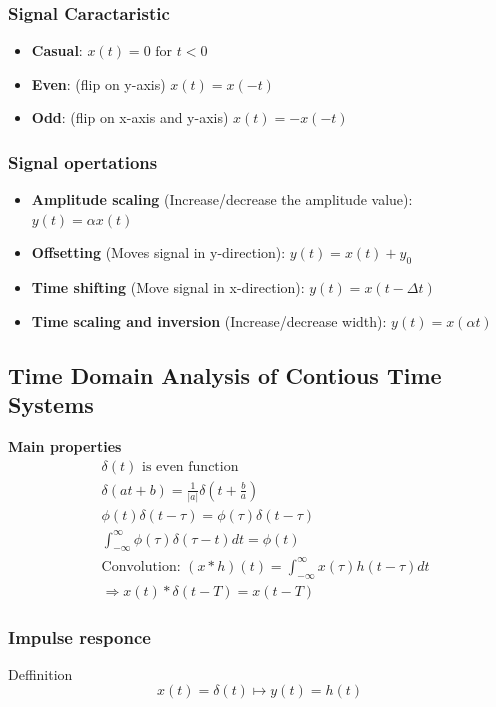 \begin{multicols}{2}
\subsubsection{Signal Caractaristic}
\begin{itemize}
    \item \textbf{Casual}: $x(t)=0 \text{ for } t<0$
    \item \textbf{Even}: (flip on y-axis) $x(t)=x(-t)$
    \item \textbf{Odd}: (flip on x-axis and y-axis) $x(t)=-x(-t)$
\end{itemize}


\subsubsection{Signal opertations}
\begin{itemize}
    \item \textbf{Amplitude scaling} (Increase/decrease the amplitude value): $y(t)=\alpha x(t)$
    \item \textbf{Offsetting} (Moves signal in y-direction): $y(t)=x(t)+y_0$
    \item \textbf{Time shifting} (Move signal in x-direction): $y(t)=x(t-\Delta t)$
    \item \textbf{Time scaling and inversion} (Increase/decrease width): $y(t) = x(\alpha t)$
\end{itemize}


\subsection{Time Domain Analysis of Contious Time Systems}
\textbf{Main properties}
\begin{align*}
    &\delta(t) \text{ is even function} \\
    &\delta(at+b) = \frac{1}{|a|}\delta(t+\frac{b}{a}) \\
    &\phi(t)\delta(t-\tau) = \phi(\tau)\delta(t-\tau) \\
    &\int_{-\infty}^{\infty}\phi(\tau)\delta(\tau-t)dt = \phi(t) \\
    &\text{Convolution: } (x*h)(t) = \int_{-\infty}^{\infty}x(\tau)h(t-\tau)dt \\
    &\Rightarrow x(t)*\delta(t-T)=x(t-T)
\end{align*}

\subsubsection{Impulse responce}
Deffinition
\begin{equation*}
    x(t)=\delta(t) \mapsto y(t)=h(t)
\end{equation*}


\end{multicols}
